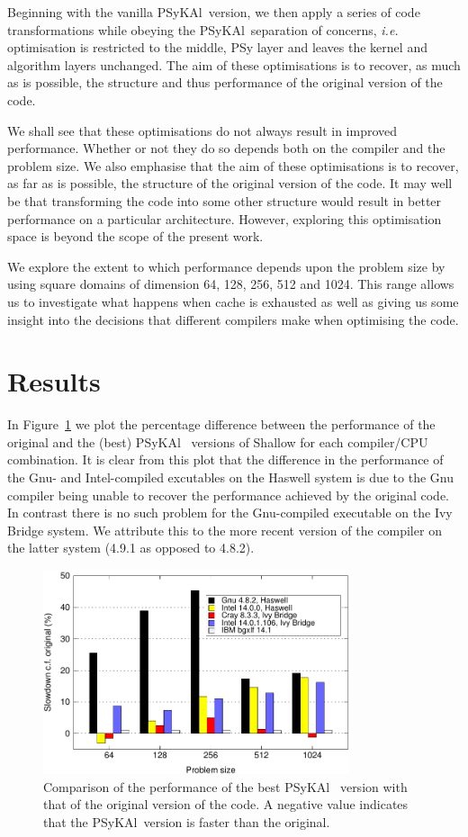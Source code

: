 \documentclass{IOS-Book-Article}
\newcommand{\psykal}{{PS}y{KA}l\ }
\begin{document}
Beginning with the vanilla \psykal version, we then apply a series of
code transformations while obeying the \psykal separation of concerns,
{\it i.e.} optimisation is restricted to the middle, {PS}y layer and
leaves the kernel and algorithm layers unchanged. The aim of these
optimisations is to recover, as much as is possible, the structure and
thus performance of the original version of the code.

We shall see that these optimisations do not always result in improved
performance. Whether or not they do so depends both on the compiler
and the problem size. We also emphasise that the aim of these
optimisations is to recover, as far as is possible, the structure of
the original version of the code. It may well be that transforming the
code into some other structure would result in better performance on a
particular architecture. However, exploring this optimisation space is
beyond the scope of the present work.

We explore the extent to which performance depends upon the problem
size by using square domains of dimension 64, 128, 256, 512 and
1024. This range allows us to investigate what happens when cache is
exhausted as well as giving us some insight into the decisions that
different compilers make when optimising the code.

\section{Results}

In Figure~\ref{FIG_slowdown_summary} we plot the percentage difference
between the performance of the original and the (best) \psykal
versions of Shallow for each compiler/CPU combination.  It is clear
from this plot that the difference in the performance of the Gnu- and
Intel-compiled excutables on the Haswell system is due to the Gnu
compiler being unable to recover the performance achieved by the
original code. In contrast there is no such problem for the
Gnu-compiled executable on the Ivy Bridge system. We attribute this to
the more recent version of the compiler on the latter system (4.9.1 as
opposed to 4.8.2).

\begin{figure}[!t]
\centering
\includegraphics[width=90mm]{slowdown_summary}
\caption{Comparison of the performance of the best \psykal
version with that of the original version of the code. A negative value 
indicates that the \psykal version is faster than the original.}
\label{FIG_slowdown_summary}
\end{figure}
\end{document}

